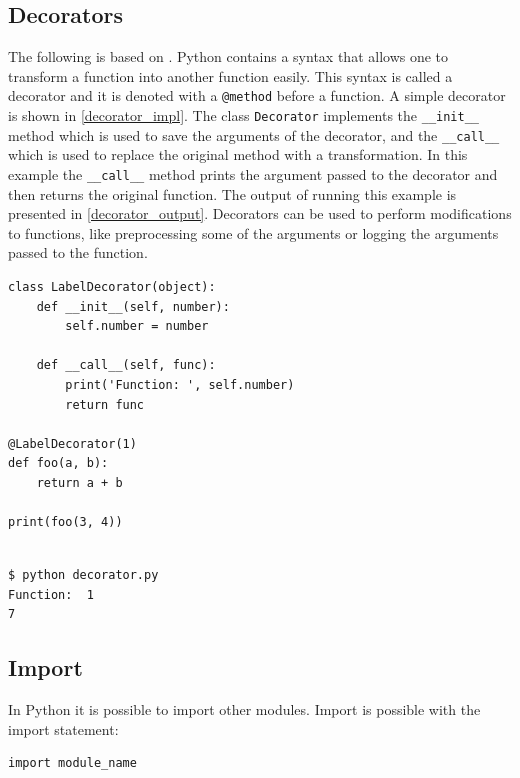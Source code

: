 \subsection{Decorators}\label{python:decorators}
The following is based on \citet[p.~558]{lutz2013learning}.
Python contains a syntax that allows one to transform a function into another function easily.
This syntax is called a decorator and it is denoted with a \texttt{@method} before a function.
A simple decorator is shown in \cref{decorator_impl}.
The class \texttt{Decorator} implements the \texttt{\_\_init\_\_} method which is used to save the arguments of the decorator, and the \texttt{\_\_call\_\_} which is used to replace the original method with a transformation.
In this example the \texttt{\_\_call\_\_} method prints the argument passed to the decorator and then returns the original function.
The output of running this example is presented in \cref{decorator_output}.
Decorators can be used to perform modifications to functions, like preprocessing some of the arguments or logging the arguments passed to the function.


\begin{lstlisting}[style=python, caption={Implementation of a simple decorator}, label={decorator_impl}]
class LabelDecorator(object):
    def __init__(self, number):
        self.number = number

    def __call__(self, func):
        print('Function: ', self.number)
        return func
        
@LabelDecorator(1)
def foo(a, b):
    return a + b

print(foo(3, 4))
 
\end{lstlisting}

\begin{lstlisting}[style=python, caption={Output when running the previous example}, label={decorator_output}]
$ python decorator.py
Function:  1
7
\end{lstlisting}

\subsection{Import}\label{python:import}
In Python it is possible to import other modules.
Import is possible with the import statement:

\begin{lstlisting}[style=python, caption={Import statement.}, label={import:standard}]
  import module_name
\end{lstlisting}

